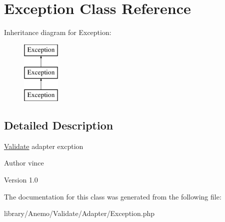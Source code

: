 \hypertarget{class_anemo_1_1_validate_1_1_adapter_1_1_exception}{
\section{Exception Class Reference}
\label{class_anemo_1_1_validate_1_1_adapter_1_1_exception}
}
Inheritance diagram for Exception:\begin{figure}[H]
\begin{center}
\leavevmode
\includegraphics[height=3.000000cm]{class_anemo_1_1_validate_1_1_adapter_1_1_exception}
\end{center}
\end{figure}


\subsection{Detailed Description}
\hyperlink{class_anemo_1_1_validate}{Validate} adapter excption \begin{DoxyAuthor}{Author}
vince 
\end{DoxyAuthor}
\begin{DoxyVersion}{Version}
1.0 
\end{DoxyVersion}


The documentation for this class was generated from the following file:\begin{DoxyCompactItemize}
\item 
library/Anemo/Validate/Adapter/Exception.php\end{DoxyCompactItemize}
